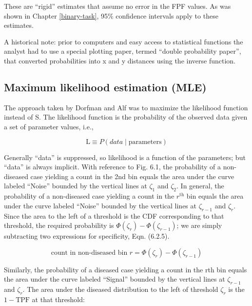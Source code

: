 \documentclass[
]{book}
\begin{document}
These are ``rigid'' estimates that assume no error in the FPF values. As was shown in Chapter \ref{binary-task}, 95\% confidence intervals apply to these estimates.

A historical note: prior to computers and easy access to statistical functions the analyst had to use a special plotting paper, termed ``double probability paper'', that converted probabilities into x and y distances using the inverse function.

\hypertarget{maximum-likelihood-estimation-mle}{%
\subsection{Maximum likelihood estimation (MLE)}\label{maximum-likelihood-estimation-mle}}

The approach taken by Dorfman and Alf was to maximize the likelihood function instead of S. The likelihood function is the probability of the observed data given a set of parameter values, i.e.,

\begin{equation*} 
\text {L} \equiv P\left ( data \mid \text {parameters} \right )
\end{equation*}

Generally ``data'' is suppressed, so likelihood is a function of the parameters; but ``data'' is always implicit. With reference to Fig. 6.1, the probability of a non-diseased case yielding a count in the 2nd bin equals the area under the curve labeled ``Noise'' bounded by the vertical lines at \(\zeta_1\) and \(\zeta_2\). In general, the probability of a non-diseased case yielding a count in the \(r^\text{th}\) bin equals the area under the curve labeled ``Noise'' bounded by the vertical lines at \(\zeta_{r-1}\) and \(\zeta_r\). Since the area to the left of a threshold is the CDF corresponding to that threshold, the required probability is \(\Phi\left ( \zeta_r \right ) - \Phi\left ( \zeta_{r-1} \right )\); we are simply subtracting two expressions for specificity, Eqn. (6.2.5).

\begin{equation*} 
\text {count in non-diseased bin } r = \Phi\left ( \zeta_r \right ) - \Phi\left ( \zeta_{r-1} \right )
\end{equation*}

Similarly, the probability of a diseased case yielding a count in the rth bin equals the area under the curve labeled ``Signal'' bounded by the vertical lines at \(\zeta_{r-1}\) and \(\zeta_r\). The area under the diseased distribution to the left of threshold \(\zeta_r\) is the \(1 - \text{TPF}\) at that threshold:
\end{document}
